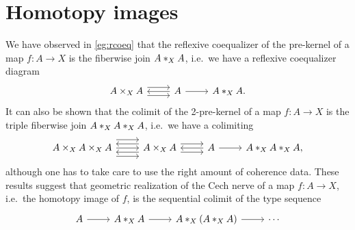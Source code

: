 \chapter{Homotopy images}\label{chap:image}

We have observed in \cref{eg:rcoeq} that the reflexive coequalizer of the pre-kernel of a map $f:A\to X$ is the fiberwise join $\join[X]{A}{A}$, i.e.~we have a reflexive coequalizer diagram
\begin{equation*}
\begin{tikzcd}
A\times_X A \arrow[r,yshift=1ex] \arrow[r,yshift=-1ex] & A \arrow[l] \arrow[r] & \join[X]{A}{A}.
\end{tikzcd}
\end{equation*}
It can also be shown that the colimit of the 2-pre-kernel of a map $f:A\to X$ is the triple fiberwise join $\join[X]{A}{\join[X]{A}{A}}$, i.e.~we have a colimiting 
\begin{equation*}
\begin{tikzcd}
A\times_{X} A \times_{X} A \arrow[r,yshift=2ex] \arrow[r] \arrow[r,yshift=-2ex] & A \times_X A \arrow[l,yshift=1ex] \arrow[l,yshift=-1ex] \arrow[r,yshift=1ex] \arrow[r,yshift=-1ex] & A \arrow[l] \arrow[r] & \join[X]{A}{\join[X]{A}{A}},
\end{tikzcd}
\end{equation*}
although one has to take care to use the right amount of coherence data.
These results suggest that geometric realization of the Cech nerve of a map $f:A\to X$, i.e.~the homotopy image of $f$, is the sequential colimit of the type sequence
\begin{equation*}
\begin{tikzcd}
A \arrow[r] & \join[X]{A}{A} \arrow[r] & \join[X]{A}{(\join[X]{A}{A})} \arrow[r] & \cdots
\end{tikzcd}
\end{equation*}
